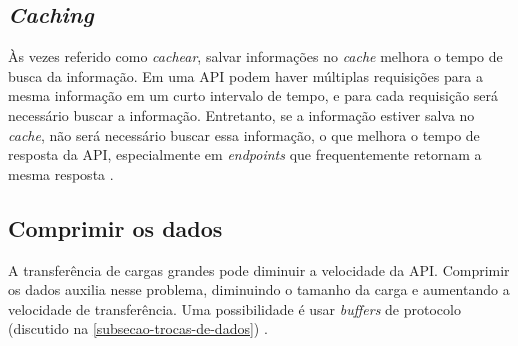 

\subsection{\emph{Caching}}
Às vezes referido como \emph{cachear}, salvar informações no \emph{cache} melhora o tempo de busca da informação. Em uma API podem haver múltiplas requisições para a mesma informação em um curto intervalo de tempo, e para cada requisição será necessário buscar a informação. Entretanto, se a informação estiver salva no \emph{cache}, não será necessário buscar essa informação, o que melhora o tempo de resposta da API, especialmente em \emph{endpoints} que frequentemente retornam a mesma resposta \cite{rapidAPI-twitter}.

\subsection{Comprimir os dados}
A transferência de cargas grandes pode diminuir a velocidade da API. Comprimir os dados auxilia nesse problema, diminuindo o tamanho da carga e aumentando a velocidade de transferência. Uma possibilidade é usar \emph{buffers} de protocolo (discutido na \autoref{subsecao-trocas-de-dados}) \cite{rapidAPI-twitter}.



